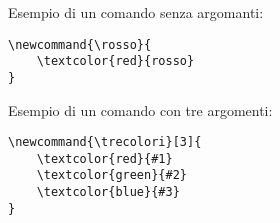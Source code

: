 Esempio di un comando senza argomanti:
\begin{lstlisting}
\newcommand{\rosso}{
    \textcolor{red}{rosso}
}
\end{lstlisting}

Esempio di un comando con tre argomenti:
\begin{lstlisting}
\newcommand{\trecolori}[3]{
    \textcolor{red}{#1} 
    \textcolor{green}{#2} 
    \textcolor{blue}{#3}
}
\end{lstlisting}